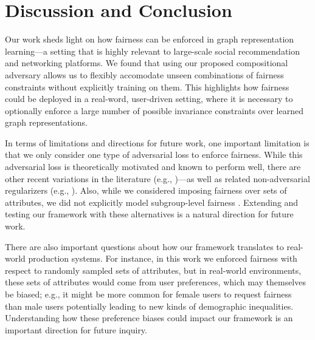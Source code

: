 \vspace{-2mm}
\section{Discussion and Conclusion}

Our work sheds light on how fairness can be enforced in graph representation learning---a setting that is highly relevant to large-scale social recommendation and networking platforms. 
We found that using our proposed compositional adversary allows us to flexibly accomodate unseen combinations of fairness constraints without explicitly training on them. This highlights how fairness could be deployed in a real-word, user-driven setting, where it is necessary to optionally enforce a large number of possible invariance constraints over learned graph representations. 

In terms of limitations and directions for future work, one important limitation is that we only consider one type of adversarial loss to enforce fairness.
While this adversarial loss is theoretically motivated and known to perform well, there are other recent variations in the literature (e.g., \citet{madras2018learning})---as well as related non-adversarial regularizers (e.g., \citet{zemel2013learning}). Also, while we considered imposing fairness over sets of attributes, we did not explicitly model subgroup-level fairness \cite{kearns2017preventing}.
Extending and testing our framework with these alternatives is a natural direction for future work. 

There are also important questions about how our framework translates to real-world production systems. For instance, in this work we enforced fairness with respect to randomly sampled sets of attributes, but in real-world environments, these sets of attributes would come from user preferences, which may themselves be biased; e.g., it might be more common for female users to request fairness than male users potentially leading to new kinds of demographic inequalities. Understanding how these preference biases could impact our framework is an important direction for future inquiry. 



